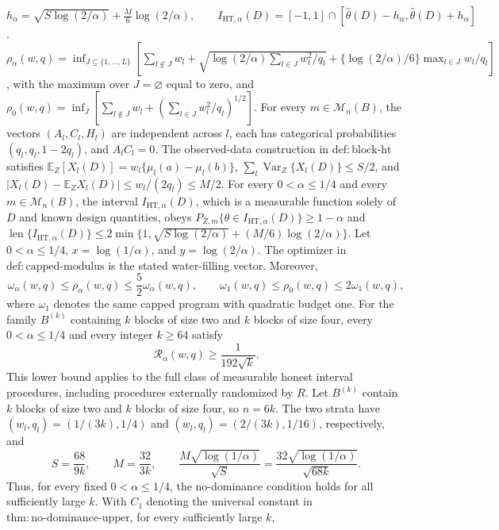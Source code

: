 \(h_\alpha=\sqrt{S\log(2/\alpha)}+\frac{M}{6}\log(2/\alpha),\qquad I_{\mathrm{HT},\alpha}(D)=[-1,1]\cap[\widehat\theta(D)-h_\alpha,\widehat\theta(D)+h_\alpha]\).
\(\rho_\alpha(w,q)=\inf_{J\subseteq\{1,\ldots,L\}}[\sum_{l\notin J}w_l+\sqrt{\log(2/\alpha)\sum_{l\in J}w_l^2/q_l}+\{\log(2/\alpha)/6\}\max_{l\in J}w_l/q_l]\), with the maximum over \(J=\varnothing\) equal to zero, and \(\rho_0(w,q)=\inf_J[\sum_{l\notin J}w_l+(\sum_{l\in J}w_l^2/q_l)^{1/2}]\).
For every \(m\in\mathcal M_n(B)\), the vectors \((A_l,C_l,H_l)\) are independent across \(l\), each has categorical probabilities \((q_l,q_l,1-2q_l)\), and \(A_lC_l=0\). The observed-data construction in \(\mathrm{def{:}block\text{-}ht}\) satisfies \(\mathbb E_Z[X_l(D)]=w_l\{\mu_l(a)-\mu_l(b)\}\), \(\sum_l\operatorname{Var}_Z\{X_l(D)\}\le S/2\), and \(|X_l(D)-\mathbb E_ZX_l(D)|\le w_l/(2q_l)\le M/2\).
For every \(0<\alpha\le1/4\) and every \(m\in\mathcal M_n(B)\), the interval \(I_{\mathrm{HT},\alpha}(D)\), which is a measurable function solely of \(D\) and known design quantities, obeys \(P_{Z,m}\{\theta\in I_{\mathrm{HT},\alpha}(D)\}\ge1-\alpha\) and \(\operatorname{len}\{I_{\mathrm{HT},\alpha}(D)\}\le2\min\{1,\sqrt{S\log(2/\alpha)}+(M/6)\log(2/\alpha)\}\).
Let \(0<\alpha\le1/4\), \(x=\log(1/\alpha)\), and \(y=\log(2/\alpha)\). The optimizer in \(\mathrm{def{:}capped\text{-}modulus}\) is the stated water-filling vector. Moreover,
\[
 \omega_\alpha(w,q)\le\rho_\alpha(w,q)\le\frac52\omega_\alpha(w,q),
 \qquad
 \omega_1(w,q)\le\rho_0(w,q)\le2\omega_1(w,q),
\]
where \(\omega_1\) denotes the same capped program with quadratic budget one.
For the family \(B^{(k)}\) containing \(k\) blocks of size two and \(k\) blocks of size four, every \(0<\alpha\le1/4\) and every integer \(k\ge64\) satisfy
\[
 \mathcal R_\alpha(w,q)\ge\frac{1}{192\sqrt{k}}.
\]
This lower bound applies to the full class of measurable honest interval procedures, including procedures externally randomized by \(R\).
Let \(B^{(k)}\) contain \(k\) blocks of size two and \(k\) blocks of size four, so \(n=6k\). The two strata have \((w_l,q_l)=(1/(3k),1/4)\) and \((w_l,q_l)=(2/(3k),1/16)\), respectively, and
\[
 S=\frac{68}{9k},\qquad M=\frac{32}{3k},\qquad
 \frac{M\sqrt{\log(1/\alpha)}}{\sqrt S}
 =\frac{32\sqrt{\log(1/\alpha)}}{\sqrt{68k}}.
\]
Thus, for every fixed \(0<\alpha\le1/4\), the no-dominance condition holds for all sufficiently large \(k\). With \(C_1\) denoting the universal constant in \(\mathrm{thm{:}no\text{-}dominance\text{-}upper}\), for every sufficiently large \(k\),
